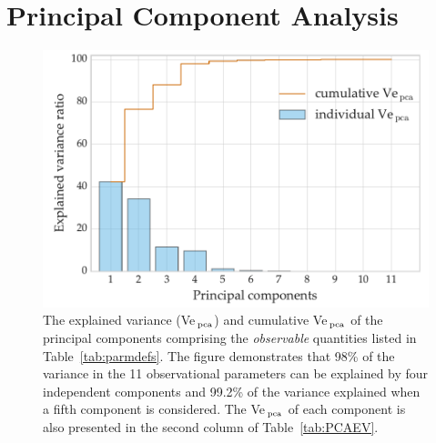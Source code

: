 \section{Principal Component Analysis}
\label{sec:PCA}
\begin{figure}
    \centering
    \includegraphics[width=0.8\linewidth]{PCA_CUMUL3.pdf}
    \caption[Explained variance of principal components]{{The explained variance (Ve$_{\,\rm{pca}}$) and cumulative Ve$_{\,\rm{pca}}$ of the principal components comprising the \emph{observable} quantities listed in Table~\ref{tab:parmdefs}. The figure demonstrates that 98\% of the variance in the 11 observational parameters can be explained by four independent components and 99.2\% of the variance explained when a fifth component is considered. The Ve$_{\,\rm{pca}}$ of each component is  also presented in the second column of Table~\ref{tab:PCAEV}. }}
    \label{fig:GCA-pca}
\end{figure}


